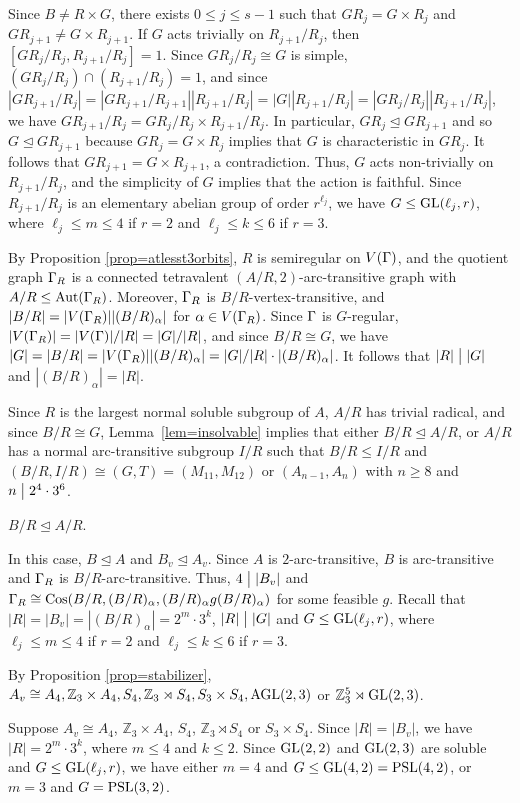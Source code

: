 \documentclass[12pt]{article}
\def\a{\alpha} \def\b{\beta} \def\g{\gamma} \def\d{\delta} \def\e{\varepsilon}
\def\di{\bigm|} \def\lg{\langle} \def\rg{\rangle}
\def\f{\noindent}
\def\PSL{\hbox{\rm PSL}}\def\PSU{\hbox{\rm PSU}}
\def\AGL{\hbox{\rm AGL}}
\def\Aut{\hbox{\rm Aut}}
\def\Cos{\hbox{\rm Cos}}
\def\mz{{\mathbb Z}}
\begin{document}
Since $B\neq R\times G$, there exists $0\leq j\leq s-1$ such that $GR_j=G\times R_j$ and $GR_{j+1}\not=G\times R_{j+1}$. If $G$ acts trivially on $R_{j+1}/R_j$, then $[GR_j/R_j,R_{j+1}/R_j]=1$. Since $GR_j/R_j\cong G$ is simple, $(GR_j/R_j)\cap (R_{j+1}/R_j)=1$, and since $|GR_{j+1}/R_j|=|GR_{j+1}/R_{j+1}||R_{j+1}/R_j|=|G||R_{j+1}/R_j|=|GR_j/R_j||R_{j+1}/R_j|$, we have $GR_{j+1}/R_j=GR_j/R_j\times R_{j+1}/R_j$. In particular, $GR_j\unlhd GR_{j+1}$ and so $G\unlhd GR_{j+1}$ because $GR_j=G\times R_j$ implies that $G$ is characteristic in $GR_j$. It follows that $GR_{j+1}=G\times R_{j+1}$, a contradiction. Thus, $G$ acts non-trivially on $R_{j+1}/R_j$, and the simplicity of $G$ implies that the action is faithful. Since $R_{j+1}/R_j$ is an elementary abelian group of order $r^{\ell_j}$, we have $G\leq \hbox{\rm GL}(\ell_j,r)$, where $\ell_j\leq m\leq 4$ if $r=2$ and $\ell_j\leq k\leq 6$ if $r=3$.

By Proposition \ref{prop=atlesst3orbits}, $R$ is semiregular on $V(\Gamma)$, and the quotient graph $\Gamma_{R}$ is a connected tetravalent $(A/R,2)$-arc-transitive graph with $A/R\leq \Aut(\G_{R})$. Moreover, $\Gamma_R$ is $B/R$-vertex-transitive, and $|B/R|=|V(\G_R)||(B/R)_\a|$ for $\a\in V(\G_R)$. Since $\Gamma$ is $G$-regular, $|V(\Gamma_R)|=|V(\Gamma)|/|R|=|G|/|R|$, and since $B/R\cong G$, we have $|G|=|B/R|=|V(\G_R)||(B/R)_\a|=|G|/|R|\cdot |(B/R)_\a|$. It follows that $|R|\di |G|$ and $|(B/R)_\a|=|R|$.

Since $R$ is the largest normal soluble subgroup of $A$, $A/R$ has trivial radical, and since $B/R\cong G$, Lemma~\ref{lem=insolvable} implies that either $B/R\unlhd A/R$, or $A/R$ has a normal arc-transitive subgroup $I/R$ such that $B/R\leq I/R$ and $(B/R,I/R) \cong (G,T)=(M_{11},M_{12})$ or $(A_{n-1},A_n)$ with $n\geq 8$ and $n\di 2^4\cdot 3^6$.

\medskip
\f {\bf Case 1:} $B/R\unlhd A/R$.

In this case, $B\unlhd A$ and $B_v\unlhd A_v$. Since $A$ is $2$-arc-transitive, $B$ is arc-transitive and  $\Gamma_R$ is $B/R$-arc-transitive. Thus, $4\di |B_v|$ and   $\G_R\cong \Cos(B/R,(B/R)_\a, (B/R)_\a g (B/R)_\a)$ for some feasible $g$.
Recall that $|R|=|B_v|=|(B/R)_\a|=2^m\cdot 3^k$, $|R|\di |G|$ and $G\leq \hbox{\rm GL}(\ell_j,r)$, where $\ell_j\leq m\leq 4$ if $r=2$ and $\ell_j\leq k\leq 6$ if $r=3$.

By Proposition \ref{prop=stabilizer}, $A_v\cong A_4, \mz_3\times A_4, S_4,  \mz_3\rtimes S_4, S_3\times S_4, \AGL(2,3)$ or $\mz_3^5 \rtimes \GL(2,3)$.

Suppose $A_v\cong A_4$, $\mz_3\times A_4$, $S_4$, $\mz_3\rtimes S_4$ or $ S_3\times S_4$. Since $|R|=|B_v|$, we have $|R|=2^m\cdot 3^k$, where  $m\leq 4$ and $k\leq 2$.  Since $\hbox{\rm GL}(2,2)$ and $\hbox{\rm GL}(2,3)$ are soluble and $G\leq \hbox{\rm GL}(\ell_j,r)$, we have either $m=4$ and $G\leq \GL(4,2)=\PSL(4,2)$, or $m=3$ and $G=\PSL(3,2)$.
\end{document}
